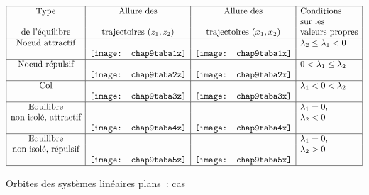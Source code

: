 \begin{table}
\hspace*{-5mm}
\begin{eqnarray*}
\begin{array}{|c|c|c|l|}
\hline
\mbox{Type}&\mbox{Allure des}& \mbox{Allure des} &\mbox{Conditions}\\&&& \mbox{sur les}\\
\mbox{de l'{é}quilibre}&\mbox{trajectoires }(z_1,z_2)&\mbox{trajectoires }(x_1,x_2)&
\mbox{valeurs propres}\\
\hline
\mbox{Noeud attractif} & & &\lambda_2 \leq \lambda_1 < 0\\
&\mbox{\texttt{[image: chap9taba1z]}}&\mbox{\texttt{[image: chap9taba1x]}} &\\
\hline
\mbox{Noeud répulsif}& & & 0<\lambda_1\leq\lambda_2 \\
&\mbox{\texttt{[image: chap9taba2z]}}& \mbox{\texttt{[image: chap9taba2x]}} &\\
\hline
\mbox{Col} & & & \lambda_1 < 0 < \lambda_2 \\
&\mbox{\texttt{[image: chap9taba3z]}}& \mbox{\texttt{[image: chap9taba3x]}}&\\
\hline
\mbox{Equilibre} && &\lambda _1 = 0,  \\
\mbox{non isol{é}, attractif}&&&\lambda_2 < 0\\
&\mbox{\texttt{[image: chap9taba4z]}}&\mbox{\texttt{[image: chap9taba4x]}} &\\
\hline
\mbox{Equilibre} && &\lambda _1 = 0, \\
\mbox{non isol{é}, répulsif}&&& \lambda_2 > 0 \\
&\mbox{\texttt{[image: chap9taba5z]}}& \mbox{\texttt{[image: chap9taba5x]}}&\\
\hline
\end{array}
\end{eqnarray*}
\caption{Orbites des systèmes linéaires plans~: cas}
\label{tablea}
\end{table}

